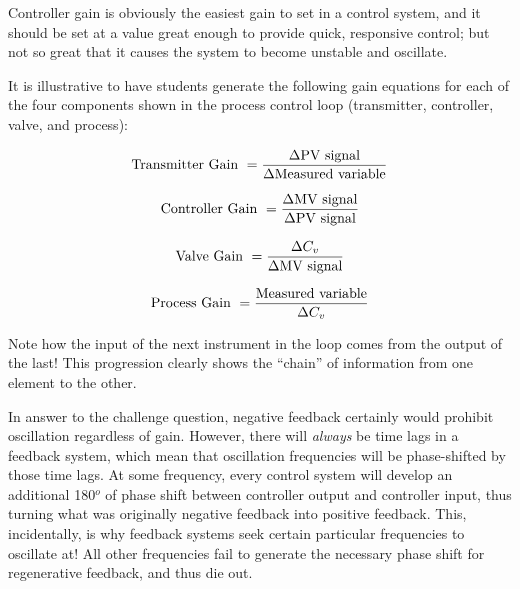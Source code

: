 





Controller gain is obviously the easiest gain to set in a control system, and it should be set at a value great enough to provide quick, responsive control; but not so great that it causes the system to become unstable and oscillate.

\vskip 10pt

It is illustrative to have students generate the following gain equations for each of the four components shown in the process control loop (transmitter, controller, valve, and process):

$$\hbox{Transmitter Gain } = {\Delta \hbox{PV signal} \over \Delta \hbox{Measured variable}}$$

$$\hbox{Controller Gain } = {\Delta \hbox{MV signal} \over \Delta \hbox{PV signal}}$$

$$\hbox{Valve Gain } = {\Delta C_v \over \Delta \hbox{MV signal}}$$

$$\hbox{Process Gain } = {\hbox{Measured variable} \over \Delta C_v}$$

Note how the input of the next instrument in the loop comes from the output of the last!  This progression clearly shows the ``chain'' of information from one element to the other.

\vskip 10pt

In answer to the challenge question, negative feedback certainly would prohibit oscillation regardless of gain.  However, there will {\it always} be time lags in a feedback system, which mean that oscillation frequencies will be phase-shifted by those time lags.  At some frequency, every control system will develop an additional 180$^{o}$ of phase shift between controller output and controller input, thus turning what was originally negative feedback into positive feedback.  This, incidentally, is why feedback systems seek certain particular frequencies to oscillate at!  All other frequencies fail to generate the necessary phase shift for regenerative feedback, and thus die out.




